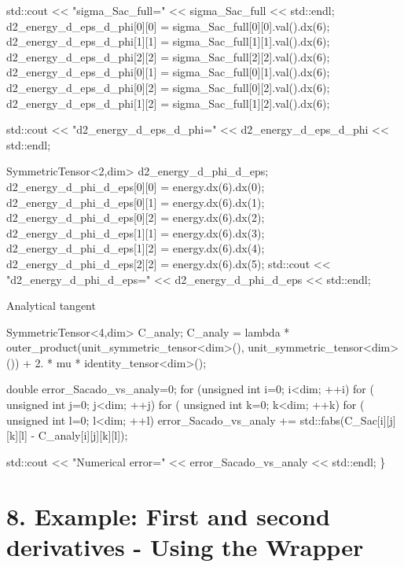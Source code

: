 \begin{DoxyCode}
std::cout << \textcolor{stringliteral}{"sigma\_Sac\_full="} << sigma\_Sac\_full << std::endl;
d2\_energy\_d\_eps\_d\_phi[0][0] = sigma\_Sac\_full[0][0].val().dx(6);
d2\_energy\_d\_eps\_d\_phi[1][1] = sigma\_Sac\_full[1][1].val().dx(6);
d2\_energy\_d\_eps\_d\_phi[2][2] = sigma\_Sac\_full[2][2].val().dx(6);
d2\_energy\_d\_eps\_d\_phi[0][1] = sigma\_Sac\_full[0][1].val().dx(6);
d2\_energy\_d\_eps\_d\_phi[0][2] = sigma\_Sac\_full[0][2].val().dx(6);
d2\_energy\_d\_eps\_d\_phi[1][2] = sigma\_Sac\_full[1][2].val().dx(6);

std::cout << \textcolor{stringliteral}{"d2\_energy\_d\_eps\_d\_phi="} << d2\_energy\_d\_eps\_d\_phi << std::endl;

SymmetricTensor<2,dim> d2\_energy\_d\_phi\_d\_eps;
d2\_energy\_d\_phi\_d\_eps[0][0] = energy.dx(6).dx(0);
d2\_energy\_d\_phi\_d\_eps[0][1] = energy.dx(6).dx(1);
d2\_energy\_d\_phi\_d\_eps[0][2] = energy.dx(6).dx(2);
d2\_energy\_d\_phi\_d\_eps[1][1] = energy.dx(6).dx(3);
d2\_energy\_d\_phi\_d\_eps[1][2] = energy.dx(6).dx(4);
d2\_energy\_d\_phi\_d\_eps[2][2] = energy.dx(6).dx(5);
std::cout << \textcolor{stringliteral}{"d2\_energy\_d\_phi\_d\_eps="} << d2\_energy\_d\_phi\_d\_eps << std::endl;
\end{DoxyCode}
 Analytical tangent 
\begin{DoxyCode}
     SymmetricTensor<4,dim> C\_analy;
     C\_analy = lambda * outer\_product(unit\_symmetric\_tensor<dim>(), unit\_symmetric\_tensor<dim>()) + 2. * mu
       * identity\_tensor<dim>();
 
    \textcolor{keywordtype}{double} error\_Sacado\_vs\_analy=0;
    \textcolor{keywordflow}{for} (\textcolor{keywordtype}{unsigned} \textcolor{keywordtype}{int} i=0; i<dim; ++i)
        \textcolor{keywordflow}{for} ( \textcolor{keywordtype}{unsigned} \textcolor{keywordtype}{int} j=0; j<dim; ++j)
            \textcolor{keywordflow}{for} ( \textcolor{keywordtype}{unsigned} \textcolor{keywordtype}{int} k=0; k<dim; ++k)
                \textcolor{keywordflow}{for} ( \textcolor{keywordtype}{unsigned} \textcolor{keywordtype}{int} l=0; l<dim; ++l)
                    error\_Sacado\_vs\_analy += std::fabs(C\_Sac[i][j][k][l] - C\_analy[i][j][k][l]);
 
    std::cout << \textcolor{stringliteral}{"Numerical error="} << error\_Sacado\_vs\_analy << std::endl;
\}
\end{DoxyCode}
 \hypertarget{index_Ex8}{}\section{8. Example\+: First and second derivatives -\/ Using the Wrapper}\label{index_Ex8}

